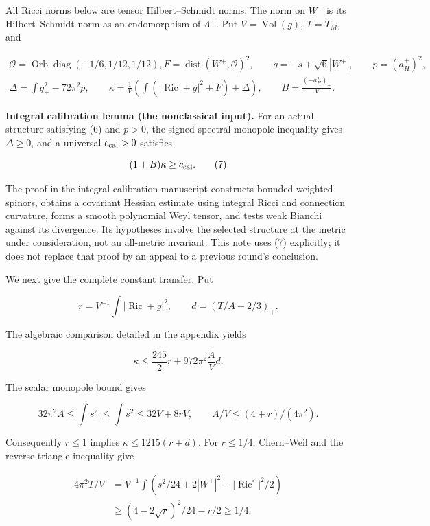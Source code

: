 \documentclass[
  10pt,
]{article}
\begin{document}
All Ricci norms below are tensor Hilbert--Schmidt norms. The norm on
\(W^+\) is its Hilbert--Schmidt norm as an endomorphism of
\(\Lambda^+\). Put \(V=\operatorname{Vol}(g)\), \(T=T_M\), and

\[
\begin{gathered}
\mathscr O=\operatorname{Orb}\operatorname{diag}(-1/6,1/12,1/12),
F=\operatorname{dist}(W^+,\mathscr O)^2,\qquad
q=-s+\sqrt6|W^+|,\qquad p=(a_H^+)^2,\\
\Delta=\int q_+^2-72\pi^2p,\qquad
\kappa=\frac1V\left(\int(|\operatorname{Ric}+g|^2+F)+\Delta\right),
\qquad B=\frac{(-a_H^2)_+}{V}.
\end{gathered}
\]

\textbf{Integral calibration lemma (the nonclassical input).} For an
actual structure satisfying (6) and \(p>0\), the signed spectral
monopole inequality gives \(\Delta\ge0\), and a universal
\(c_{\rm cal}>0\) satisfies

\[
                    (1+B)\kappa\ge c_{\rm cal}.         \tag{7}
\]

The proof in the integral calibration manuscript constructs bounded
weighted spinors, obtains a covariant Hessian estimate using integral
Ricci and connection curvature, forms a smooth polynomial Weyl tensor,
and tests weak Bianchi against its divergence. Its hypotheses involve
the selected structure at the metric under consideration, not an
all-metric invariant. This note uses (7) explicitly; it does not replace
that proof by an appeal to a previous round's conclusion.

We next give the complete constant transfer. Put

\[
r=V^{-1}\int|\operatorname{Ric}+g|^2,\qquad
d=(T/A-2/3)_+.
\]

The algebraic comparison detailed in the appendix yields

\[
\kappa\le\frac{245}{2}r+972\pi^2\frac AVd.              \tag{8}
\]

The scalar monopole bound gives

\[
32\pi^2A\le\int s_-^2\le\int s^2\le32V+8rV,
\qquad A/V\le(4+r)/(4\pi^2).
\]

Consequently \(r\le1\) implies \(\kappa\le1215(r+d)\). For \(r\le1/4\),
Chern--Weil and the reverse triangle inequality give

\[
\begin{aligned}
4\pi^2T/V
&=V^{-1}\int\left(s^2/24+2|W^+|^2
                    -|\operatorname{Ric}^{\circ}|^2/2\right)\\
&\ge(4-2\sqrt r)^2/24-r/2\ge1/4.
\end{aligned}                                           \tag{9}
\]
\end{document}
